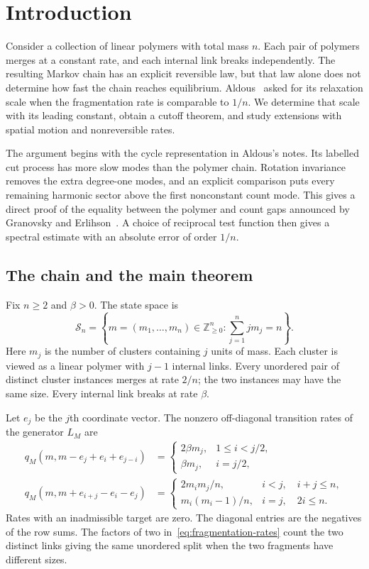\section{Introduction}

Consider a collection of linear polymers with total mass $n$. Each pair
of polymers merges at a constant rate, and each internal link breaks
independently. The resulting Markov chain has an explicit reversible
law, but that law alone does not determine how fast the chain reaches
equilibrium. Aldous~\cite{AldousNotes,AldousProblemPage} asked for its
relaxation scale when the fragmentation rate is comparable to $1/n$.
We determine that scale with its leading constant, obtain a cutoff
theorem, and study extensions with spatial motion and nonreversible
rates.

The argument begins with the cycle representation in Aldous's notes.
Its labelled cut process has more slow modes than the polymer chain.
Rotation invariance removes the extra degree-one modes, and an explicit
comparison puts every remaining harmonic sector above the first
nonconstant count mode. This gives a direct proof of the equality
between the polymer and count gaps announced by Granovsky and
Erlihson~\cite{GranovskyErlihson2009}. A choice of reciprocal test
function then gives a spectral estimate with an absolute error of
order $1/n$.

\subsection{The chain and the main theorem}

Fix $n\ge2$ and $\beta>0$. The state space is
\[
 \mathcal S_n=\left\{m=(m_1,\ldots,m_n)\in\mathbb Z_{\ge0}^n:
                     \sum_{j=1}^n j m_j=n\right\}.
\]
Here $m_j$ is the number of clusters containing $j$ units of mass. Each cluster is viewed as a linear polymer with $j-1$ internal links. Every unordered pair of distinct cluster instances merges at rate $2/n$; the two instances may have the same size. Every internal link breaks at rate $\beta$.

Let $e_j$ be the $j$th coordinate vector. The nonzero off-diagonal transition rates of the generator $L_M$ are
\begin{align}
 q_M(m,m-e_j+e_i+e_{j-i})
  &=\begin{cases}
        2\beta m_j,&1\le i<j/2,\\
        \beta m_j,&i=j/2,
     \end{cases}\label{eq:fragmentation-rates}\\
 q_M(m,m+e_{i+j}-e_i-e_j)
  &=\begin{cases}
        2m_i m_j/n,&i<j,\quad i+j\le n,\\
        m_i(m_i-1)/n,&i=j,\quad 2i\le n.
     \end{cases}\label{eq:coagulation-rates}
\end{align}
Rates with an inadmissible target are zero. The diagonal entries are the negatives of the row sums. The factors of two in~\eqref{eq:fragmentation-rates} count the two distinct links giving the same unordered split when the two fragments have different sizes.

